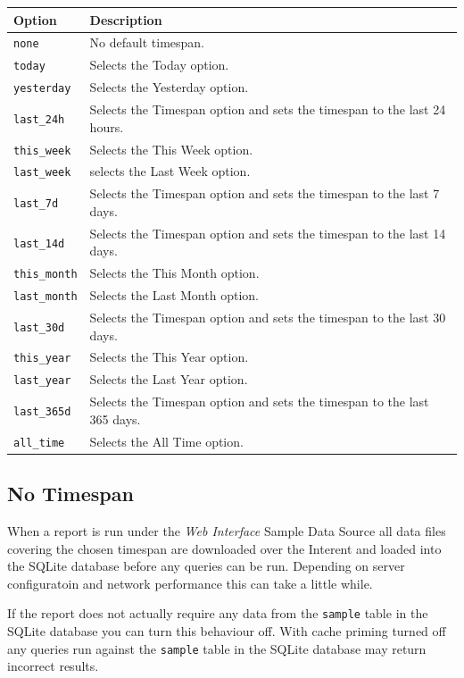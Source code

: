 \documentclass[a4paper,10pt]{book}
\begin{document}
\begin{tabular}{p{2.5cm} l}
\hline
\textbf{Option} & \textbf{Description} \\
\hline
\verb|none| & No default timespan.\\
\verb|today| & Selects the Today option.\\
\verb|yesterday| & Selects the Yesterday option.\\
\verb|last_24h|  & Selects the Timespan option and sets the timespan to the last 24 hours.\\
\verb|this_week| & Selects the This Week option.\\
\verb|last_week| & selects the Last Week option.\\
\verb|last_7d| & Selects the Timespan option and sets the timespan to the last 7 days.\\
\verb|last_14d| & Selects the Timespan option and sets the timespan to the last 14 days.\\
\verb|this_month| & Selects the This Month option.\\
\verb|last_month| & Selects the Last Month option.\\
\verb|last_30d| & Selects the Timespan option and sets the timespan to the last 30 days.\\
\verb|this_year| & Selects the This Year option.\\
\verb|last_year| & Selects the Last Year option.\\
\verb|last_365d| & Selects the Timespan option and sets the timespan to the last 365 days.\\
\verb|all_time| & Selects the All Time option.\\
\hline
\end{tabular}

\subsection{No Timespan}
\label{sec_no_timespan}
When a report is run under the \emph{Web Interface} Sample Data Source all data files covering the chosen timespan are downloaded over the Interent and loaded into the SQLite database before any queries can be run. Depending on server configuratoin and network performance this can take a little while.

If the report does not actually require any data from the \verb|sample| table in the SQLite database you can turn this behaviour off. With cache priming turned off any queries run against the \verb|sample| table in the SQLite database may return incorrect results.
\end{document}
